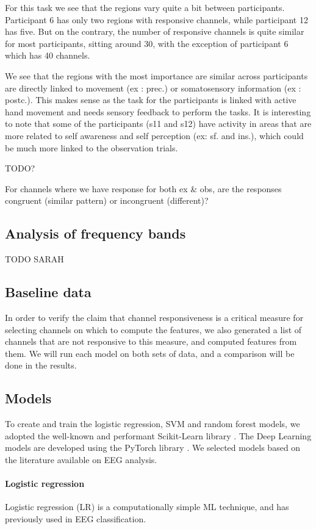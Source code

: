 \documentclass[10pt,conference,compsocconf]{IEEEtran}
\begin{document}
For this task we see that the regions vary quite a bit between participants. Participant 6 has only two regions with responsive channels, while participant 12 has five. But on the contrary, the number of responsive channels is quite similar for most participants, sitting around 30, with the exception of participant 6 which has 40 channels.

We see that the regions with the most importance are similar across participants are directly linked to movement (ex : prec.) or somatosensory information (ex : postc.). This makes sense as the task for the participants is linked with active hand movement and needs sensory feedback to perform the tasks. It is interesting to note that some of the participants (s11 and s12) have activity in areas that are more related to self awareness and self perception (ex: sf. and ins.), which could be much more linked to the observation trials.

TODO?

For channels where we have response for both ex \& obs, are the responses congruent (similar pattern) or incongruent (different)?

\subsection{Analysis of frequency bands}
TODO SARAH

\subsection{Baseline data}
In order to verify the claim that channel responsiveness is a critical measure for selecting channels on which to compute the features, we also generated a list of channels that are not responsive to this measure, and computed features from them. We will run each model on both sets of data, and a comparison will be done in the results.

\subsection{Models}
To create and train the logistic regression, SVM and random forest models, we adopted the well-known and performant Scikit-Learn library \cite{scikitlearn}. The Deep Learning models are developed using the PyTorch library \cite{pytorch}. We selected models based on the literature available on EEG analysis.

\paragraph{Logistic regression}
Logistic regression (LR) is a computationally simple ML technique, and has previously used in EEG classification\cite{SUBASI200587, NIPS2006_35937e34}.
\end{document}
